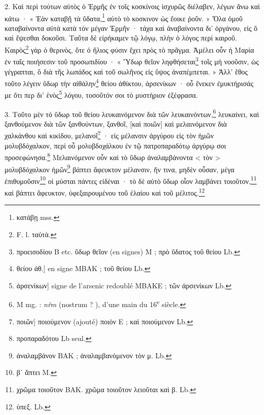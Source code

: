 \documentclass[landscape, a4paper, 11pt, oneside, polutonikogreek, french]{article}
\begin{document}
2. Καὶ περὶ τούτων αὐτὸς ὁ Ἑρμῆς ἐν τοῖς κοσκίνοις ἰσχυρῶς διέλαβεν, λέγων ἄνω καὶ κάτω · « Ἐὰν καταβῇ τὰ ὕδατα,\footnote{κατάβῃ mss.} αὐτὸ τὸ κοσκινον ὡς ἔοικε ῥοῦν. » Ὅλα ὁμοῦ καταβαίνοντα αὐτὰ κατὰ τὸν μέγαν Ἑρμῆν · τάχα καὶ ἀναβαίνοντα δι' ὀργάνου, εἰς ὃ καὶ ἕψεσθαι δοκοῦσι. Ταῦτα δὲ εἰρήκαμεν τῷ λόγῳ, πλὴν ὁ λόγος περὶ καιροῦ. Καιρὸς\footnote{F. l. ταὐτὰ.} γὰρ ὁ θερινὸς, ὅτε ὁ ἥλιος φύσιν ἔχει πρὸς τὸ πρᾶγμα. Ἀμέλει οὖν ἡ Μαρία ἐν ταῖς ποιήσεσιν τοῦ προσωπιδίου · « Ὕδωρ θεῖον ληφθήσεται\footnote{προεισοδίου B etc. ὕδωρ θεῖον (en signes) M ; πρὸ ὕδατος τοῦ θείου Lb.} τοῖς μὴ νοοῦσιν, ὡς γέγραπται, ὃ διὰ τῆς λωπάδος καὶ τοῦ σωλῆνος εἰς ὕψος ἀναπέμπεται. » Ἀλλ' ἔθος τοῦτο λέγειν ὕδωρ τὴν αἰθάλην\footnote{θείου ἀθ.] en signe MBAK ; τοῦ θείου Lb.} θείου ἀθίκτου, ἀρσενίκων · οὗ ἕνεκεν ἐμυκτήρισάς με ὅτι περ δι' ἑνὸς\footnote{ἀρσενίκων] signe de l'arsenic redoublé MBAKE ; τῶν ἀρσενίκων Lb.} λόγου, τοσοῦτόν σοι τὸ μυστήριον ἐξέφρασα.

3. Τοῦτο μὲν τὸ ὕδωρ τοῦ θείου λευκαινόμενον διὰ τῶν λευκαινόντων,\footnote{M mg. : \emph{nřm} (nostrum ? ), d'une main du 16\textsuperscript{e} siècle.} λευκαίνει, καὶ ξανθούμενον διὰ τῶν ξανθούντων, ξανθοῖ, [καὶ ποιῶν] καὶ μελαινόμενον διὰ χαλκάνθου καὶ κικίδου, μελανοῖ\footnote{ποιῶν] ποιούμενον (ajouté) ποιὸν E ; καὶ ποιούμενον Lb.} · εἰς μέλανσιν ἀργύρου εἰς τὸν ἡμῶν μολυβδόχαλκον, περὶ οὗ μολυβδοχάλκου ἐν τῷ πατροπαραδότῳ ἀργύρῳ σοι προσεφώνησα.\footnote{προπαραδότου Lb seul.} Μελαινόμενον οὖν καὶ τὸ ὕδωρ ἀναλαμβάνοντα < τὸν > μολυβδόχαλκον ἡμῶν\footnote{ἀναλαμβάνον BAK ; ἀναλαμβανόμενον τὸν μ. Lb.} βάπτει ἄφευκτον μέλανσιν, ἥν τινα, μηδὲν οὖσαν, μέγα ἐπιθυμοῦσιν\footnote{βʹ ἅπτει M.} οἱ μύσται πάντες εἰδέναι · τὸ δὲ αὐτὸ ὕδωρ οἷον λαμβάνει τοιοῦτον,\footnote{χρῶμα τοιοῦτον BAK. χρῶμα τοιοῦτον λειοῦται καὶ β. Lb.} καὶ βάπτει ἄφευκτον, ὑφεξαιρουμένου τοῦ ἐλαίου καὶ τοῦ μέλιτος.\footnote{ὑπεξ. Lb.}
\end{document}
